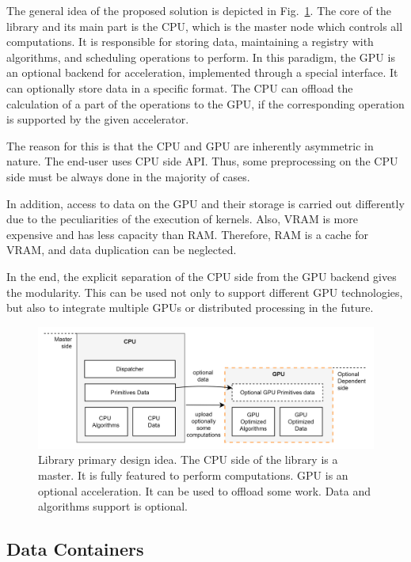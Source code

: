 The general idea of the proposed solution is depicted in Fig.~\ref{fig:design_idea}. The core of the library and its main part is the CPU, which is the master node which controls all computations. It is responsible for storing data, maintaining a registry with algorithms, and scheduling operations to perform. In this paradigm, the GPU is an optional backend for acceleration, implemented through a special interface. It can optionally store data in a specific format. The CPU can offload the calculation of a part of the operations to the GPU, if the corresponding operation is supported by the given accelerator.

The reason for this is that the CPU and GPU are inherently asymmetric in nature. The end-user uses CPU side API. Thus, some preprocessing on the CPU side must be always done in the majority of cases. 

In addition, access to data on the GPU and their storage is carried out differently due to the peculiarities of the execution of kernels. Also, VRAM is more expensive and has less capacity than RAM. Therefore, RAM is a cache for VRAM, and data duplication can be neglected. 

In the end, the explicit separation of the CPU side from the GPU backend gives the modularity. This can be used not only to support different GPU technologies, but also to integrate multiple GPUs or distributed processing in the future.

\begin{figure}[ht]
    \centering
    \includegraphics[width=1.0\textwidth]{images/spla_design_idea.png}
    \caption{Library primary design idea. The CPU side of the library is a master. It is fully featured to perform computations. GPU is an optional acceleration. It can be used to offload some work. Data and algorithms support is optional.}
    \label{fig:design_idea}
\end{figure}

\subsection{Data Containers}

